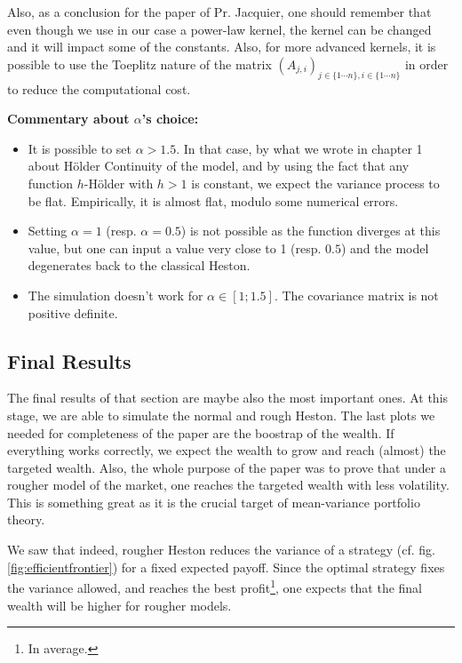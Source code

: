 \begin{remarque}
Also, as a conclusion for the paper of Pr. Jacquier, one should remember that even though we use in our case a power-law kernel, the kernel can be changed and it will impact some of the constants. Also, for more advanced kernels, it is possible to use the Toeplitz nature of the matrix $(A_{j,i})_{ j \in \{1 \cdots n \} , i \in \{1 \cdots n \} } $ in order to reduce the computational cost.
\end{remarque}


\textbf{Commentary about $\alpha$'s choice:}
\begin{itemize}
\item  It is possible to set $\alpha > 1.5$. In that case, by what we wrote in chapter 1 about Hölder Continuity of the model, and by using the fact that any function $h$-Hölder with $h> 1$ is constant, we expect the variance process to be flat. Empirically, it is almost flat, modulo some numerical errors.

\item Setting $\alpha = 1$ (resp. $\alpha = 0.5$) is not possible as the function diverges at this value, but one can input a value very close to 1 (resp. $0.5$) and the model degenerates back to the classical Heston.

\item The simulation doesn't work for $\alpha \in [1;1.5]$. The covariance matrix is not positive definite.
\end{itemize}

\subsection{Final Results}

The final results of that section are maybe also the most important ones. At this stage, we are able to simulate the normal and rough Heston. The last plots we needed for completeness  of the paper \cite{HanWong} are the boostrap of the wealth. If everything works correctly, we expect the wealth to grow and reach (almost) the targeted wealth. Also, the whole purpose of the paper \cite{HanWong} was to prove that under a rougher model of the market, one reaches the targeted wealth with less volatility. This is something great as it is the crucial target of mean-variance portfolio theory. 

We saw that indeed, rougher Heston reduces the variance of a strategy (cf. fig. \ref{fig:efficientfrontier}) for a fixed expected payoff. Since the optimal strategy fixes the variance allowed, and reaches the best profit\footnote{In average.}, one expects that the final wealth will be higher for rougher models.


